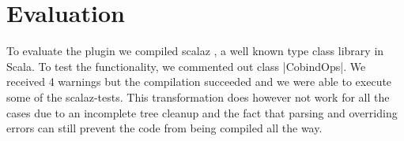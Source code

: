 \section{Evaluation}

To evaluate the plugin we compiled scalaz \cite{scalaz}, a well known type class library in Scala. To test the functionality, we commented out class |CobindOps|. We received 4 warnings but the compilation succeeded and we were able to execute some of the scalaz-tests. This transformation does however not work for all the cases due to an incomplete tree cleanup and the fact that parsing and overriding errors can still prevent the code from being compiled all the way.